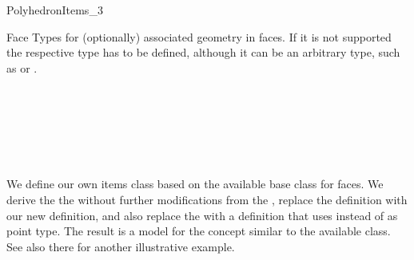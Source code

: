 \begin{ccRefConcept}{PolyhedronItems_3}
\begin{ccClass}{Face}
Types for (optionally) associated geometry in faces. If it is not
supported the respective type has to be defined, although it can be
an arbitrary type, such as  or .





\ccTagFullDeclarations
{}
         

\ccGlue
{}


%

\ccTagDefaults

\end{ccClass}

\ccHasModels


\ccSeeAlso

\\
\\
\\
\\
\\

\ccExample

We define our own items class based on the available
 base class for faces. We derive the
the  without further modifications from the
, replace the 
definition with our new definition, and also replace the
 with a definition that uses  instead
of  as point type. The result is a model for the
 concept similar to the available
 class. See also there for another
illustrative example.


\end{ccRefConcept}
